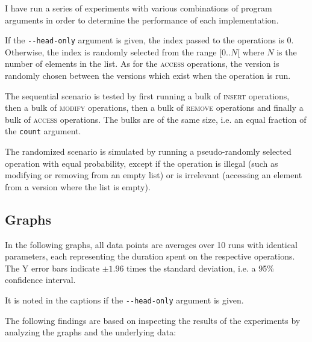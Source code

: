 I have run a series of experiments with various combinations of program
arguments in order to determine the performance of each implementation.

If the \texttt{-\@{}-head-only} argument is given, the index passed to
the operations is 0. Otherwise, the index is randomly selected from the range
$[0..N[$ where $N$ is the number of elements in the list. As for the
\textsc{access} operations, the version is randomly chosen between the versions
which exist when the operation is run.

The sequential scenario is tested by first running a bulk of \textsc{insert}
operations, then a bulk of \textsc{modify} operations, then a bulk of
\textsc{remove} operations and finally a bulk of \textsc{access} operations. The
bulks are of the same size, i.e. an equal fraction of the \texttt{count}
argument.

The randomized scenario is simulated by running a pseudo-randomly selected
operation with equal probability, except if the operation is illegal (such as
modifying or removing from an empty list) or is irrelevant (accessing an element
from a version where the list is empty).

\subsection{Graphs}

In the following graphs, all data points are averages over 10 runs with
identical parameters, each representing the duration spent on the respective
operations. The Y error bars indicate $\pm 1.96$ times the standard deviation,
i.e. a 95\% confidence interval.

It is noted in the captions if the \texttt{-\@{}-head-only} argument is given.

The following findings are based on inspecting the results of the experiments by
analyzing the graphs and the underlying data:

